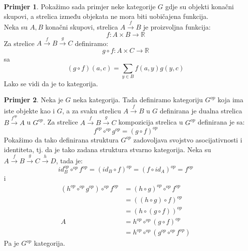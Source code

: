 \documentclass[11pt]{article}
\theoremstyle{definition}
\newtheorem{primjer}{Primjer}
\begin{document}
  \begin{primjer}
    Pokažimo sada primjer neke kategorije $G$ gdje su objekti konačni skupovi,
    a strelica između objekata ne mora biti uobičajena funkcija.\\
    Neka su $A, B$ konačni skupovi, strelica $A \xrightarrow{f} B$ je
    proizvoljna funkcija:
    \begin{equation*}
      f:A \times B \rightarrow \mathbb{R}
    \end{equation*}
    Za strelice $A \xrightarrow{f} B \xrightarrow{g} C$ definiramo:
    \begin{equation*}
      g \circ f:A \times C \rightarrow \mathbb{R}
    \end{equation*}
    sa
    \begin{equation*}
      (g \circ f)(a, c) = \sum_{y \in B}f(a, y)g(y,c)
    \end{equation*}
    Lako se vidi da je to kategorija.  \end{primjer}

  \begin{primjer}
    Neka je $G$ neka kategorija. Tada definiramo kategoriju $G^{op}$ koja ima
    iste objekte kao i $G$, a za svaku strelicu $A \xrightarrow{f} B$ u $G$ 
    definirana je dualna strelica $B \xrightarrow{f^{op}} A$ u $G^{op}$.
    Za strelice $A \xrightarrow{f} B \xrightarrow{g} C$ kompozicija strelica
    u $G^{op}$ definirana je sa:
    \begin{equation*}
      f^{op} \circ^{op} g^{op} = (g \circ f)^{op}
    \end{equation*}
    Pokažimo da tako definirana struktura $G^{op}$ zadovoljava svojstvo
    asocijativnosti i identiteta, tj. da je tako zadana struktura stvarno
    kategorija.
    Neka su $A \xrightarrow{f} B \xrightarrow{g} C \xrightarrow{h} D$, tada je:
    \begin{equation*}
      id^{op}_B \circ^{op} f^{op} = (id_B \circ f)^{op} = (f \circ id_A)^{op} =
      f^{op}
    \end{equation*}
    i
    \begin{align*}
      (h^{op} \circ^{op} g^{op}) \circ^{op} f^{op} &= (h \circ g)^{op} \circ^{op} f^{op}\\
      &= ((h \circ g) \circ f)^{op}\\
      &= (h \circ (g \circ f))^{op}\\
      A
      &= h^{op} \circ^{op} (g \circ f)^{op}\\
      &= h^{op} \circ^{op} (g^{op} \circ^{op} f^{op})
    \end{align*}
    Pa je $G^{op}$ kategorija.
  \end{primjer}
\end{document}
